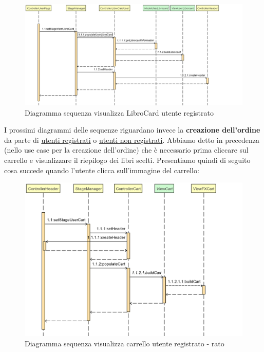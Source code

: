 \documentclass[a4paper,11pt]{report}
\begin{document}
     \begin{figure}[h!]
    	\centering
    	\hspace*{-0.4in}
    	\includegraphics[width=1.3\linewidth]{Sequence diagrams/1 Registered user/UserLibrocard.png}
    	\caption{Diagramma sequenza visualizza LibroCard utente registrato}
    \end{figure}
\clearpage
 I prossimi diagrammi delle sequenze riguardano invece la \textbf{creazione dell'ordine} da parte di \underline{utenti registrati} o \underline{utenti non registrati}.
\newline
Abbiamo detto in precedenza (nello use case per la creazione dell'ordine) che è necessario prima cliccare sul carrello e visualizzare il riepilogo dei libri scelti. Presentiamo quindi di seguito cosa succede quando l'utente clicca sull'immagine del carrello:\\
 \begin{figure}[h!]
    	\centering
    	\includegraphics[width=1.2\linewidth]{Sequence diagrams/2 Order Creation/ViewCart senza metodi privati.png}
    	\caption{Diagramma sequenza visualizza carrello utente registrato - rato}
    	\label{visualizza carrello}
    \end{figure}\\
\end{document}
